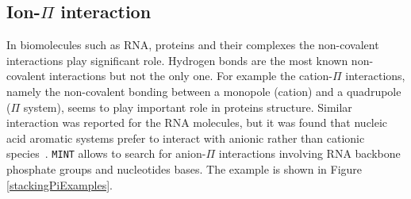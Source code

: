 \documentclass[12pt]{article}
\begin{document}
\subsection{Ion-$\Pi$ interaction}
In biomolecules such as RNA, proteins and their complexes the non-covalent interactions play significant role. Hydrogen bonds are the most known non-covalent interactions but not the only one. For example the cation-$\Pi$ interactions, namely the non-covalent bonding between a monopole (cation) and a quadrupole ($\Pi$ system), seems to play important role in proteins structure.
Similar interaction was reported for the RNA molecules, but it was found that nucleic acid aromatic systems prefer to interact with anionic rather than cationic species~\cite{Auffinger2013}. 
{\tt MINT} allows to search for anion-$\Pi$ interactions involving RNA backbone phosphate groups and nucleotides bases. The example is shown in Figure \ref{stackingPiExamples}.
\end{document}

